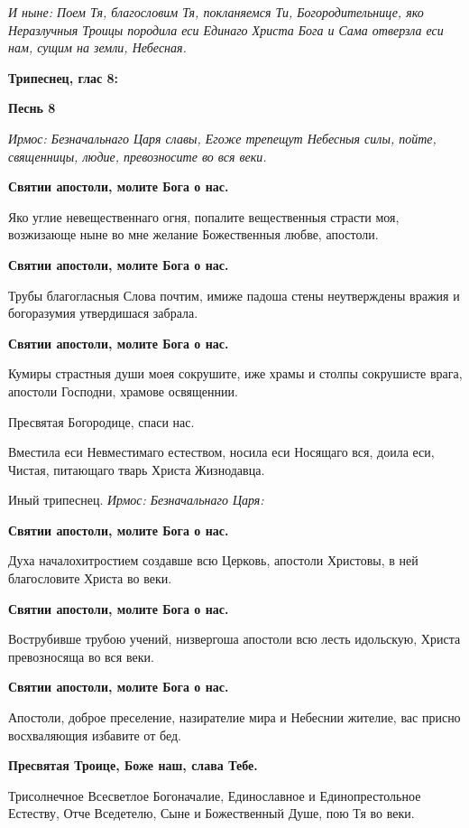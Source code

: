 \itshape И ныне\normalfont{}: Поем Тя, благословим Тя, покланяемся Ти, Богородительнице, яко Неразлучныя Троицы породила еси Единаго Христа Бога и Сама отверзла еси нам, сущим на земли, Небесная. 


\medskip
\bfseries Трипеснец, глас 8:

\normalfont{}


\medskip
\bfseries Песнь 8\normalfont{}


\itshape Ирмос\normalfont{}: Безначальнаго Царя славы, Егоже трепещут Небесныя силы, пойте, священницы, людие, превозносите во вся веки.


\bfseries Святии апостоли, молите Бога о нас.\normalfont{}


Яко углие невещественнаго огня, попалите вещественныя страсти моя, возжизающе ныне во мне желание Божественныя любве, апостоли.


\bfseries Святии апостоли, молите Бога о нас.\normalfont{}


Трубы благогласныя Слова почтим, имиже падоша стены неутверждены вражия и богоразумия утвердишася забрала.


\bfseries Святии апостоли, молите Бога о нас.\normalfont{}


Кумиры страстныя души моея сокрушите, иже храмы и столпы сокрушисте врага, апостоли Господни, храмове освященнии.


Пресвятая Богородице, спаси нас.


Вместила еси Невместимаго естеством, носила еси Носящаго вся, доила еси, Чистая, питающаго тварь Христа Жизнодавца.


Иный трипеснец. \itshape Ирмос\normalfont{}: Безначальнаго Царя:


\bfseries Святии апостоли, молите Бога о нас.\normalfont{}


Духа началохитростием создавше всю Церковь, апостоли Христовы, в ней благословите Христа во веки.


\bfseries Святии апостоли, молите Бога о нас.\normalfont{}


Вострубивше трубою учений, низвергоша апостоли всю лесть идольскую, Христа превозносяща во вся веки.


\bfseries Святии апостоли, молите Бога о нас.\normalfont{}


Апостоли, доброе преселение, назирателие мира и Небеснии жителие, вас присно восхваляющия избавите от бед.


\bfseries Пресвятая Троице, Боже наш, слава Тебе.\normalfont{}


Трисолнечное Всесветлое Богоначалие, Единославное и Единопрестольное Естеству, Отче Вседетелю, Сыне и Божественный Душе, пою Тя во веки.


